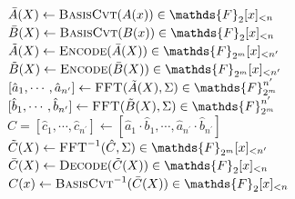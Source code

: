     \begin{algorithm2e}[H]
        \caption{Fast Additive FFT Multiplication}
        \label{alg:fafft}
        $\bar{A}(X) \gets \textsc{BasisCvt}(A(x)) \in \mathds{F}_2[x]_{<n}$\;
        $\bar{B}(X) \gets \textsc{BasisCvt}(B(x)) \in \mathds{F}_2[x]_{<n}$\;
        $\tilde{A}(X) \gets \textsc{Encode}(\bar{A}(X)) \in \mathds{F}_{2^m}[x]_{<n^\prime}$\;
        $\tilde{B}(X) \gets \textsc{Encode}(\bar{B}(X)) \in \mathds{F}_{2^m}[x]_{<n^\prime}$\;
        $[\hat{a}_1, \cdots, \hat{a}_{n^\prime}] \gets \textsc{FFT}(\tilde{A}(X), \Sigma) \in \mathds{F}_{2^m}^{n^\prime}$\;
        $[\hat{b}_1, \cdots, \hat{b}_{n^\prime}] \gets \textsc{FFT}(\tilde{B}(X), \Sigma) \in \mathds{F}_{2^m}^{n^\prime}$\;
        $\hat{C} = [\hat{c}_1, \cdots, \hat{c}_{n^\prime}] \gets [\hat{a}_1\cdot \hat{b}_1, \cdots, \hat{a}_{n^\prime}\cdot \hat{b}_{n^\prime}]$\;
        $\tilde{C}(X) \gets \textsc{FFT}^{-1}(\hat{C}, \Sigma) \in \mathds{F}_{2^m}[x]_{<n^\prime}$\;
        $\bar{C}(X) \gets \textsc{Decode}(\tilde{C}(X)) \in \mathds{F}_2[x]_{<n}$\;
        $C(x) \gets \textsc{BasisCvt}^{-1}(\bar{C}(X)) \in \mathds{F}_2[x]_{<n}$\;
    \end{algorithm2e}

